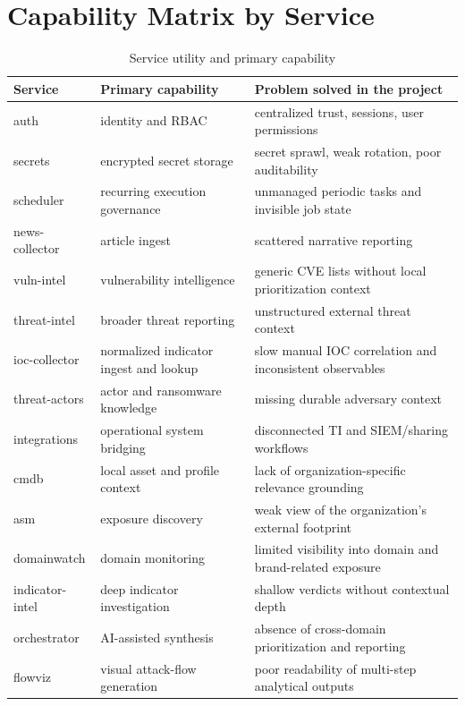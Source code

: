\section{Capability Matrix by Service}
\begin{table}[H]
\centering
\caption{Service utility and primary capability}
\label{tab:service-capabilities}
\renewcommand{\arraystretch}{1.2}
\begin{tabular}{|p{3.0cm}|p{3.8cm}|p{4.6cm}|}
\hline
\textbf{Service} & \textbf{Primary capability} & \textbf{Problem solved in the project}\\
\hline
auth & identity and RBAC & centralized trust, sessions, user permissions\\
\hline
secrets & encrypted secret storage & secret sprawl, weak rotation, poor auditability\\
\hline
scheduler & recurring execution governance & unmanaged periodic tasks and invisible job state\\
\hline
news-collector & article ingest & scattered narrative reporting\\
\hline
vuln-intel & vulnerability intelligence & generic CVE lists without local prioritization context\\
\hline
threat-intel & broader threat reporting & unstructured external threat context\\
\hline
ioc-collector & normalized indicator ingest and lookup & slow manual IOC correlation and inconsistent observables\\
\hline
threat-actors & actor and ransomware knowledge & missing durable adversary context\\
\hline
integrations & operational system bridging & disconnected TI and SIEM/sharing workflows\\
\hline
cmdb & local asset and profile context & lack of organization-specific relevance grounding\\
\hline
asm & exposure discovery & weak view of the organization's external footprint\\
\hline
domainwatch & domain monitoring & limited visibility into domain and brand-related exposure\\
\hline
indicator-intel & deep indicator investigation & shallow verdicts without contextual depth\\
\hline
orchestrator & AI-assisted synthesis & absence of cross-domain prioritization and reporting\\
\hline
flowviz & visual attack-flow generation & poor readability of multi-step analytical outputs\\
\hline
\end{tabular}
\end{table}

